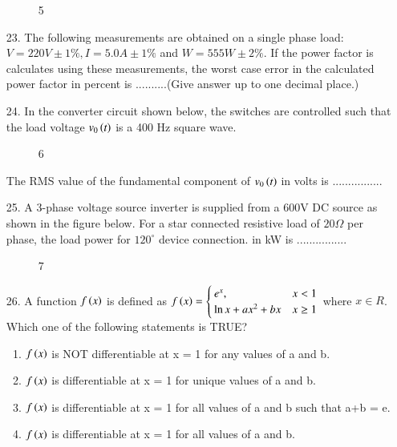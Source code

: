 \documentclass[journal]{IEEEtran}
\begin{document}
\begin{enumerate}
\begin{figure}[!ht]
        \caption{5}
    \end{figure}
    \item[23.] The following measurements are obtained on a single phase load: $V = 220 V\pm 1\%, I = 5.0A\pm 1\%$ and $W = 555W \pm 2\%$. If the power factor is calculates using these measurements, the worst case error in the calculated power factor in percent is ..........(Give answer up to one decimal place.)
    \item[24.] In the converter circuit shown below, the switches are controlled such that the load voltage $v_0\left(t\right)$ is a 400 Hz square wave.
    \begin{figure}[!ht]
        \centering
        \caption{6}
    \end{figure}
    The RMS value of the fundamental component of $v_0\left(t\right)$ in volts is ................
    \item[25.] A 3-phase voltage source inverter is supplied from a 600V DC source as shown in the figure below. For a star connected resistive load of $20\Omega$ per phase, the load power for $120^{\circ}$ device connection. in kW is ................
    \begin{figure}[!ht]
        \centering
        \caption{7}
    \end{figure}
    \item[26.] A function $f\left(x\right)$ is defined as $f\left(x\right) = \begin{cases}e^x, & x<1\\ \ln x+ax^2+bx &x\geq 1\end{cases}$ where $x \in R$. Which one of the following statements is TRUE?
    \begin{enumerate}[label = (\Alph*)]
        \item $f\left(x\right)$ is NOT differentiable at x = 1 for any values of a and b.
        \item $f\left(x\right)$ is differentiable at x = 1 for unique values of a and b.
        \item $f\left(x\right)$ is differentiable at x = 1 for all values of a and b such that a+b = e.
        \item $f\left(x\right)$ is differentiable at x = 1 for all values of a and b.
    \end{enumerate}
\end{enumerate}
\end{document}
